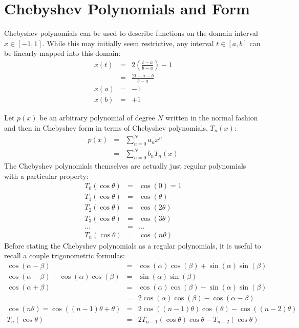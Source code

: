 \documentclass{article}
\begin{document}
\section{Chebyshev Polynomials and Form}
Chebyshev polynomials can be used to describe functions on the domain interval $ x \in [-1,1] $. While this may initially seem restrictive, any interval $ t \in [a,b] $ can be linearly mapped into this domain:
\begin{eqnarray}
    x(t) & = & 2(\frac{t - a}{b-a}) - 1 \\
    & = & \frac{2t - a - b}{b-a} \\
    x(a) & = & -1 \\
    x(b) & = & +1
\end{eqnarray}
\par
Let $ p(x) $ be an arbitrary polynomial of degree $ N $ written in the normal fashion and then in Chebyshev form in terms of Chebyshev polynomials, $ T_n(x) $:
\begin{eqnarray}
    p(x) & = & \sum_{n=0}^N a_n x^n \\
         & = & \sum_{n=0}^N b_n T_n(x)
\end{eqnarray}
The Chebyshev polynomials themselves are actually just regular polynomials with a particular property:
\begin{eqnarray}
    T_0( \cos \theta ) & = & \cos(0) = 1 \\
    T_1( \cos \theta ) & = & \cos(\theta) \\
    T_2( \cos \theta ) & = & \cos(2\theta) \\
    T_3( \cos \theta ) & = & \cos(3\theta) \\
    \hdots & = &\hdots \\
    T_n( \cos \theta ) & = & \cos(n \theta)
\end{eqnarray}
Before stating the Chebyshev polynomials as a regular polynomials, it is useful to recall a couple trigonometric formulas:
\begin{eqnarray}
\cos( \alpha - \beta ) & = & \cos(\alpha) \cos(\beta) + \sin(\alpha)\sin(\beta) \\
\cos( \alpha - \beta ) - \cos(\alpha) \cos(\beta) & = &  \sin(\alpha)\sin(\beta) \\
\cos( \alpha + \beta ) & = &  \cos(\alpha) \cos(\beta) - \sin(\alpha)\sin(\beta) \\ 
                       & = & 2 \cos(\alpha) \cos(\beta) - \cos( \alpha - \beta ) \\
\cos(n \theta) = \cos( (n-1)\theta + \theta) & = & 2 \cos\left( (n-1)\theta \right)\cos(\theta) - \cos( (n-2) \theta ) \\
T_n(\cos\theta) & = & 2 T_{n-1}(\cos\theta) \cos\theta - T_{n-2}(\cos\theta)
\end{eqnarray}
\end{document}
